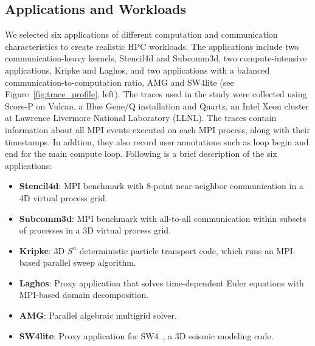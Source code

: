 \subsection{Applications and Workloads}
\label{sec:applicationworkload}

We selected six applications of different computation and communication
characteristics to create realistic HPC workloads. The applications include two
communication-heavy kernels, Stencil4d\cite{bhatele2018evaluating} and Subcomm3d\cite{bhatele2018evaluating}, two compute-intensive
applications, Kripke\cite{kripke} and Laghos\cite{laghos}, and two applications with a balanced
communication-to-computation ratio, AMG\cite{amg} and SW4lite\cite{sjogreen2018sw4} (see
Figure~\ref{fig:trace_profile}, left).  The traces used in the study were
collected using Score-P \cite{knupfer2012score} on Vulcan, a Blue Gene/Q
installation and Quartz, an Intel Xeon cluster at Lawrence Livermore National
Laboratory (LLNL). The traces contain information about all MPI events executed on each MPI process, along with their
timestamps. In addtion, they also record user annotations such as loop
begin and end for the main compute loop. Following
is a brief description of the six applications:

\begin{itemize}
\item \textbf{Stencil4d}: MPI benchmark with 8-point near-neighbor communication in a 4D virtual process grid.
\item \textbf{Subcomm3d}: MPI benchmark with all-to-all communication within subsets of processes in a 3D virtual process grid.
\item \textbf{Kripke}: 3D $S^n$ deterministic particle transport code, which runs an
  MPI-based parallel sweep algorithm.
\item \textbf{Laghos}: Proxy application that solves time-dependent Euler equations with MPI-based
  domain decomposition.
\item \textbf{AMG}:  Parallel algebraic multigrid solver.
\item \textbf{SW4lite}: Proxy application for SW4~\cite{sjogreen2018sw4}, a 3D seismic modeling code.
\end{itemize}

